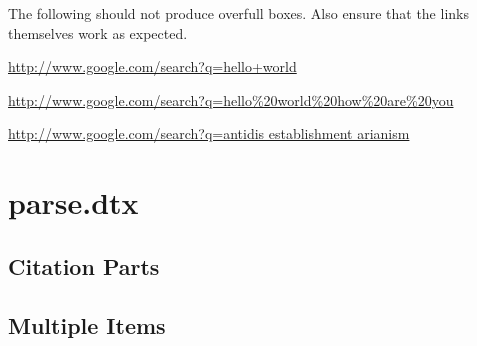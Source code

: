 \documentclass{article}
\begin{document}
\begingroup

The following should not produce overfull boxes. Also ensure that the links
themselves work as expected.

\immediate{}

\def\testbox#1{%
    \vrule\vbox{%
        \hsize 1in \relax
        \url{#1}%
    }\vrule\quad
}

\testbox{http://www.google.com/search?q=hello+world}
\testbox{http://www.google.com/search?q=hello\%20world\%20how\%20are\%20you}
\testbox{http://www.google.com/search?q=antidis establishment arianism}

\immediate{}

\endgroup


\section{parse.dtx}

\subsection{Citation Parts}




\subsection{Multiple Items}

\end{document}
